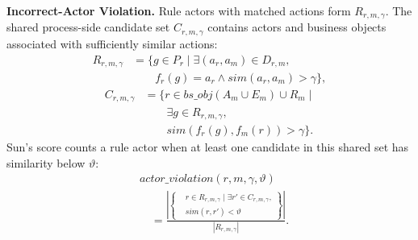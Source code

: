 \textbf{Incorrect-Actor Violation.} Rule actors with matched actions form \(R_{r,m,\gamma}\). The shared process-side candidate set \(C_{r,m,\gamma}\) contains actors and business objects associated with sufficiently similar actions:
\begin{equation}
\begin{aligned}
R_{r,m,\gamma}
&=\bigl\{g\in P_r\mid\exists(a_r,a_m)\in D_{r,m},\\
&\qquad f_r(g)=a_r\land sim(a_r,a_m)>\gamma\bigr\},
\end{aligned}
\label{eq:actor_rule_candidates}
\end{equation}
\begin{equation}
\begin{aligned}
C_{r,m,\gamma}
&=\bigl\{r\in\mathit{bs\_obj}(A_m\cup E_m)\cup R_m\mid\\
&\qquad\exists g\in R_{r,m,\gamma},\\
&\qquad sim(f_r(g),f_m(r))>\gamma\bigr\}.
\end{aligned}
\label{eq:actor_process_candidates}
\end{equation}
Sun's score counts a rule actor when at least one candidate in this shared set has similarity below \(\vartheta\):
\begin{equation}
\begin{aligned}
&\mathit{actor\_violation}(r,m,\gamma,\vartheta)\\
&\quad=\frac{
\left|\left\{\begin{aligned}
&r\in R_{r,m,\gamma}\mid\exists r'\in C_{r,m,\gamma},\\
&sim(r,r')<\vartheta
\end{aligned}\right\}\right|
}{|R_{r,m,\gamma}|}.
\end{aligned}
\label{eq:actor}
\end{equation}

